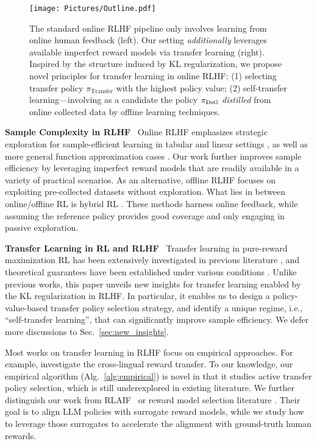\begin{figure}[t]
    \centering
    \texttt{[image: Pictures/Outline.pdf]}
    \caption{The standard online RLHF pipeline only involves learning from online human feedback (left).
    Our setting \emph{additionally} leverages available imperfect reward models via transfer learning (right).
    Inspired by the structure induced by KL regularization, we propose novel principles for transfer learning in online RLHF: (1) selecting transfer policy $\pi_\text{Transfer}$ with the highest policy value; (2) self-transfer learning---involving as a candidate the policy $\pi_{\text{Dstl}}$ \emph{distilled} from online collected data by offline learning techniques.
    }\label{fig:outline}
\end{figure}
\textbf{Sample Complexity in RLHF}~
Online RLHF emphasizes strategic exploration for sample-efficient learning in tabular and linear settings \citep{xu2020preference, novoseller2020dueling, pacchiano2021dueling, du2024exploration}, as well as more general function approximation cases \citep{ye2024theoretical, chen2022human, wang2023rlhf,xie2024exploratory,cen2024value,zhang2024self,xiong2024iterative}.
%
Our work further improves sample efficiency by leveraging imperfect reward models that are readily available in a variety of practical scenarios. 
%
%
%
As an alternative, offline RLHF \citep{zhan2023provable, liu2024provably, huang2024correcting} focuses on exploiting pre-collected datasets without exploration.
%
%
What lies in between online/offline RL is hybrid RL \citep{chang2024dataset, gao2024rebel}.
These methods harness online feedback, while assuming the reference policy provides good coverage and only engaging in passive exploration.


\textbf{Transfer Learning in RL and RLHF}~
Transfer learning in pure-reward maximization RL has been extensively investigated in previous literature \citep{taylor2009transfer, zhu2023transfer}, and theoretical guarantees have been established under various conditions \citep{mann2013directed, huang2022tiered,huang2023robust, golowich2022can}. Unlike previous works, this paper unveils new insights for transfer learning enabled by the KL regularization in RLHF. In particular, it enables us to design a policy-value-based transfer policy selection strategy, and identify a unique regime, i.e., ``self-transfer learning'', that can significantly improve sample efficiency.
We defer more discussions to Sec.~\ref{sec:new_insights}.
%
%
%

Most works on transfer learning in RLHF focus on empirical approaches.
For example, \citep{wu2024reuse, hong2024cross} investigate the cross-lingual reward transfer.
To our knowledge, our empirical algorithm (Alg.~\ref{alg:empirical}) is novel in that it studies active transfer policy selection, which is still underexplored in existing literature.
%
We further distinguish our work from RLAIF~\citep{lee2023rlaif,ji2023ai} or reward model selection literature \citep{nguyen2024laser}. Their goal is to align LLM policies with surrogate reward models, while we study how to leverage those surrogates to accelerate the alignment with ground-truth human rewards.